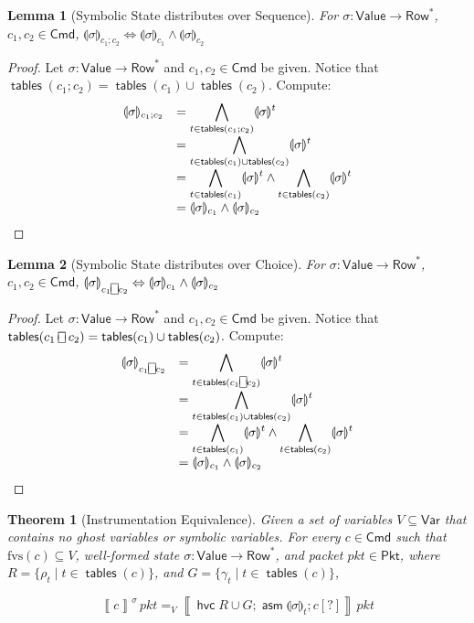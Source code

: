 \documentclass{article}
\newcommand{\pkt}{\mathit{pkt}}
\newcommand{\denote}[1]{\left\llbracket#1\right\rrbracket}
\newcommand{\Value}{\mathsf{Value}}
\newcommand{\Cmd}{\mathsf{Cmd}}
\newcommand{\Pkt}{\mathsf{Pkt}}
\newcommand{\Row}{\mathsf{Row}}
\newcommand{\Var}{\mathsf{Var}}
\newcommand{\assume}{\mathop{\mathsf{asm}}}
\newcommand{\choiceop}{\rotatebox[origin=c]{90}{$\sqsubset\!\!\!\sqsupset$}}
\newcommand{\choice}{\mathbin{\choiceop}}
\newcommand{\havoc}[1]{\mathop{\mathsf{hvc}}#1}
\newcommand{\state}[1]{\llparenthesis#1\rrparenthesis}
\newcommand{\instr}{[?]}
\newcommand{\fvs}{\textrm{fvs}}
\newcommand{\tables}{\mathop{\mathsf{tables}}}
\newtheorem{theorem}{Theorem}
\newtheorem{lemma}{Lemma}
\begin{document}
\begin{lemma}[Symbolic State distributes over Sequence]
  \label{lem:sigma-distrib-seq}
  For $\sigma : \Value \to \Row^*$, $c_1,c_2 \in \Cmd$,
  $\state\sigma_{c_1;c_2} \Leftrightarrow \state{\sigma}_{c_1}\wedge\state{\sigma}_{c_2}$
\end{lemma}

\begin{proof}
  Let $\sigma : \Value \to \Row^*$ and $c_1,c_2\in \Cmd$ be given. Notice that
  $\tables(c_1;c_2) = \tables(c_1) \cup \tables(c_2)$. Compute:
  \[
  \begin{array}{l >{\displaystyle}ll}
    \state\sigma_{c_1;c_2}
    & = \bigwedge_{ t \in \tables(c_1;c_2) } \state\sigma^t \\
    & = \bigwedge_{ t \in \tables(c_1)\cup \tables(c_2) } \state\sigma^t \\
    & = \bigwedge_{t \in \tables(c_1)} \state\sigma^t \wedge \bigwedge_{t \in \tables(c_2)} \state\sigma^t \\
    & = \state\sigma_{c_1} \wedge \state\sigma_{c_2}
  \end{array}
  \]
\end{proof}

\begin{lemma}[Symbolic State distributes over Choice]
  \label{lem:sigma-distrib-choice}
  For $\sigma : \Value \to \Row^*$, $c_1,c_2 \in \Cmd$,
  $\state\sigma_{c_1 \choice c_2} \Leftrightarrow \state{\sigma}_{c_1}\wedge\state{\sigma}_{c_2}$
\end{lemma}

\begin{proof}
  Let $\sigma : \Value \to \Row^*$ and $c_1,c_2\in \Cmd$ be given. Notice that
  $\tables(c_1 \choice c_2) = \tables(c_1) \cup \tables(c_2)$. Compute:
  \[
  \begin{array}{l >{\displaystyle}ll}
    \state\sigma_{c_1 \choice c_2}
    & = \bigwedge_{ t \in \tables(c_1 \choice c_2) } \state\sigma^t \\
    & = \bigwedge_{ t \in \tables(c_1)\cup \tables(c_2) } \state\sigma^t \\
    & = \bigwedge_{t \in \tables(c_1)} \state\sigma^t \wedge \bigwedge_{t \in \tables(c_2)} \state\sigma^t \\
    & = \state\sigma_{c_1} \wedge \state\sigma_{c_2}
  \end{array}
  \]
\end{proof}




\begin{samepage}
\begin{theorem}[Instrumentation Equivalence]
  \label{thm:instr-equiv}
  Given a set of variables $V \subseteq \Var$ that contains no ghost variables
  or symbolic variables. For every $c \in \Cmd$ such that $\fvs(c) \subseteq V$,
  well-formed state $\sigma : \Value \to \Row^*$, and packet $\pkt \in \Pkt$,
  where $R = \{\rho_t \mid t \in \tables(c)\}$, and $G = \{\gamma_t \mid t \in
  \tables(c)\}$,

  \[\denote{c}^\sigma\,\pkt =_V \denote{\havoc {R \cup G}; \assume{\state\sigma}_t; c\instr}\,\pkt  \]
\end{theorem}
\end{samepage}
\end{document}
